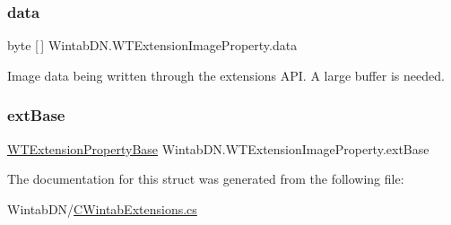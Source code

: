 \subsubsection{\texorpdfstring{data}{data}}
{\footnotesize\ttfamily byte \mbox{[}$\,$\mbox{]} Wintab\+D\+N.\+W\+T\+Extension\+Image\+Property.\+data}



Image data being written through the extensions A\+PI. A large buffer is needed. 

\mbox{\label{struct_wintab_d_n_1_1_w_t_extension_image_property_a3afbd1d9df17e3e84a42786ba23472cd}} 
\subsubsection{\texorpdfstring{ext\+Base}{extBase}}
{\footnotesize\ttfamily \mbox{\hyperlink{struct_wintab_d_n_1_1_w_t_extension_property_base}{W\+T\+Extension\+Property\+Base}} Wintab\+D\+N.\+W\+T\+Extension\+Image\+Property.\+ext\+Base}



The documentation for this struct was generated from the following file\+:\begin{DoxyCompactItemize}
\item 
Wintab\+D\+N/\mbox{\hyperlink{_c_wintab_extensions_8cs}{C\+Wintab\+Extensions.\+cs}}\end{DoxyCompactItemize}
